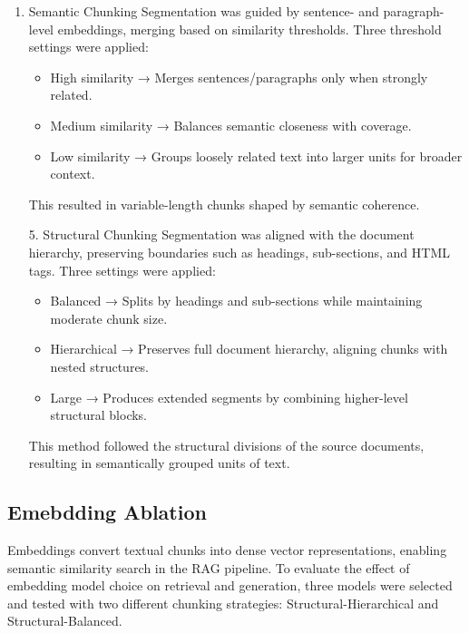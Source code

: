 \begin{enumerate}
	\item Semantic Chunking
	Segmentation was guided by sentence- and paragraph-level embeddings, merging based on similarity thresholds. Three threshold settings were applied:
	
	\begin{itemize}
		\item High similarity → Merges sentences/paragraphs only when strongly related.
		
		\item Medium similarity → Balances semantic closeness with coverage.
		
		\item Low similarity → Groups loosely related text into larger units for broader context.
	\end{itemize}
	
	This resulted in variable-length chunks shaped by semantic coherence.
	
	5. Structural Chunking
	Segmentation was aligned with the document hierarchy, preserving boundaries such as headings, sub-sections, and HTML tags. Three settings were applied:
	
	\begin{itemize}
		\item Balanced → Splits by headings and sub-sections while maintaining moderate chunk size.
		
		\item Hierarchical → Preserves full document hierarchy, aligning chunks with nested structures.
		
		\item Large → Produces extended segments by combining higher-level structural blocks.
	\end{itemize}
	
	This method followed the structural divisions of the source documents, resulting in semantically grouped units of text.
	
\end{enumerate}


\subsection{Emebdding Ablation}
Embeddings convert textual chunks into dense vector representations, enabling semantic similarity search in the RAG pipeline. To evaluate the effect of embedding model choice on retrieval and generation, three models were selected and tested with two different chunking strategies: Structural-Hierarchical and Structural-Balanced.

